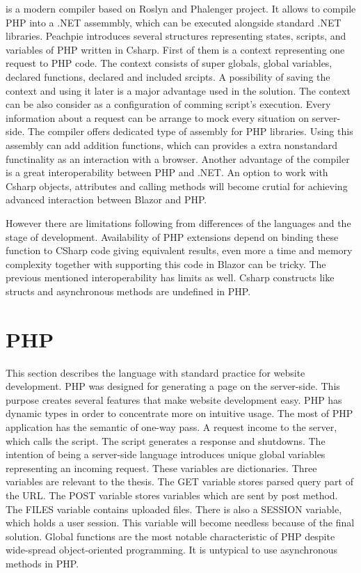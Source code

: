 \cite{Peachpie} is a modern compiler based on Roslyn and Phalenger project.
It allows to compile PHP into a .NET assemmbly, which can be executed alongside standard .NET libraries.
Peachpie introduces several structures representing states, scripts, and variables of PHP written in Csharp.
First of them is a context representing one request to PHP code.
The context consists of super globals, global variables, declared functions, declared and included srcipts.
A possibility of saving the context and using it later is a major advantage used in the solution.
The context can be also consider as a configuration of comming script's execution.
Every information about a request can be arrange to mock every situation on server-side.
The compiler offers dedicated type of assembly for PHP libraries.
Using this assembly can add addition functions, which can provides a extra nonstandard functinality as an interaction with a browser.
Another advantage of the compiler is a great interoperability between PHP and .NET.
An option to work with Csharp objects, attributes and calling methods will become crutial for achieving advanced interaction between Blazor and PHP.

However there are limitations following from differences of the languages and the stage of development.
Availability of PHP extensions depend on binding these function to CSharp code giving equivalent results, even more a time and memory complexity together with supporting this code in Blazor can be tricky.
The previous mentioned interoperability has limits as well.
Csharp constructs like structs and asynchronous methods are undefined in PHP.

\section{PHP}

This section describes the language with standard practice for website development.
PHP was designed for generating a page on the server-side.
This purpose creates several features that make website development easy.
PHP has dynamic types in order to concentrate more on intuitive usage.
The most of PHP application has the semantic of one-way pass.
A request income to the server, which calls the script.
The script generates a response and shutdowns.
The intention of being a server-side language introduces unique global variables representing an incoming request.
These variables are dictionaries.
Three variables are relevant to the thesis.
The GET variable stores parsed query part of the URL.
The POST variable stores variables which are sent by post method.
The FILES variable contains uploaded files.
There is also a SESSION variable, which holds a user session.
This variable will become needless because of the final solution.
Global functions are the most notable characteristic of PHP despite wide-spread object-oriented programming.
It is untypical to use asynchronous methods in PHP.

